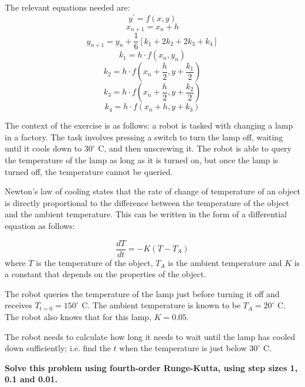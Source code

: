 \documentclass[11pt]{article}
\begin{document}
The relevant equations needed are: \[ y^\prime = f(x, y) \]
\[ x_{n+1} = x_n + h \]
\[ y_{n+1} = y_n + \frac{1}{6}[k_1 + 2k_2 + 2k_3 + k_4]\]
\[k_1 = h \cdot f(x_n,y_n)\]
\[k_2 = h \cdot f(x_n + \frac{h}{2}, y + \frac{k_1}{2})\]
\[k_3 = h \cdot f(x_n + \frac{h}{2}, y + \frac{k_2}{2})\]
\[k_4 = h \cdot f(x_n + h, y + k_3)\]

The context of the exercise is as follows: a robot is tasked with
changing a lamp in a factory. The task involves pressing a switch to
turn the lamp off, waiting until it cools down to \(30^{\circ}\) C, and
then unscrewing it. The robot is able to query the temperature of the
lamp as long as it is turned on, but once the lamp is turned off, the
temperature cannot be queried.

Newton's law of cooling states that the rate of change of temperature of
an object is directly proportional to the difference between the
temperature of the object and the ambient temperature. This can be
written in the form of a differential equation as follows:

\[\frac{dT}{dt} = -K(T - T_A)\] where \(T\) is the temperature of the
object, \(T_A\) is the ambient temperature and \(K\) is a constant that
depends on the properties of the object.

The robot queries the temperature of the lamp just before turning it off
and receives \(T_{t=0} = 150^{\circ}\) C. The ambient temperature is
known to be \(T_A = 20^{\circ}\) C. The robot also knows that for this
lamp, \(K = 0.05\).

The robot needs to calculate how long it needs to wait until the lamp
has cooled down sufficiently; i.e. find the \(t\) when the temperature
is just below \(30^{\circ}\) C.

\textbf{Solve this problem using fourth-order Runge-Kutta, using step
sizes 1, 0.1 and 0.01.}
\end{document}

